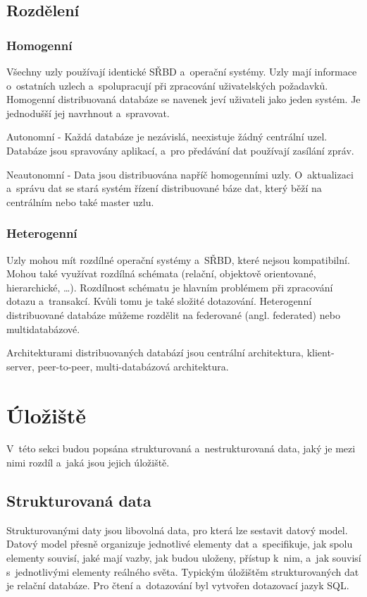 \subsection{Rozdělení}
\subsubsection{Homogenní}
Všechny uzly používají identické SŘBD a~operační systémy. Uzly mají informace o~ostatních uzlech a~spolupracují při zpracování uživatelských požadavků. Homogenní distribuovaná databáze se navenek jeví uživateli jako jeden systém. Je jednodušší jej navrhnout a~spravovat.

\vspace{0.5cm}
\noindent Autonomní - Každá databáze je nezávislá, neexistuje žádný centrální uzel. Databáze jsou spravovány aplikací, a~pro předávání dat používají zasílání zpráv.

\vspace{0.5cm}
\noindent Neautonomní - Data jsou distribuována napříč homogenními uzly. O~aktualizaci a~správu dat se stará systém řízení distribuované báze dat, který běží na centrálním nebo také master uzlu.

\subsubsection{Heterogenní}
Uzly mohou mít rozdílné operační systémy a~SŘBD, které nejsou kompatibilní. Mohou také využívat rozdílná schémata (relační, objektově orientované, hierarchické, \ldots). Rozdílnost schématu je hlavním problémem při zpracování dotazu a~transakcí. Kvůli tomu je také složité dotazování. \cite{wikiDBMS} Heterogenní distribuované databáze můžeme rozdělit na federované (angl. federated) nebo multidatabázové.

\vspace{0.5cm}
\noindent Architekturami distribuovaných databází jsou centrální architektura, klient-server, peer-to-peer, multi-databázová architektura.

\section{Úložiště}
V~této sekci budou popsána strukturovaná a~nestrukturovaná data, jaký je mezi nimi rozdíl a~jaká jsou jejich úložiště.

\subsection{Strukturovaná data}
Strukturovanými daty jsou libovolná data, pro která lze sestavit datový model. Datový model přesně organizuje jednotlivé elementy dat a~specifikuje, jak spolu elementy souvisí, jaké mají vazby, jak budou uloženy, přístup k~nim, a~jak souvisí s~jednotlivými elementy reálného světa. \cite{structData} Typickým úložištěm strukturovaných dat je relační databáze. Pro čtení a~dotazování byl vytvořen dotazovací jazyk SQL.

